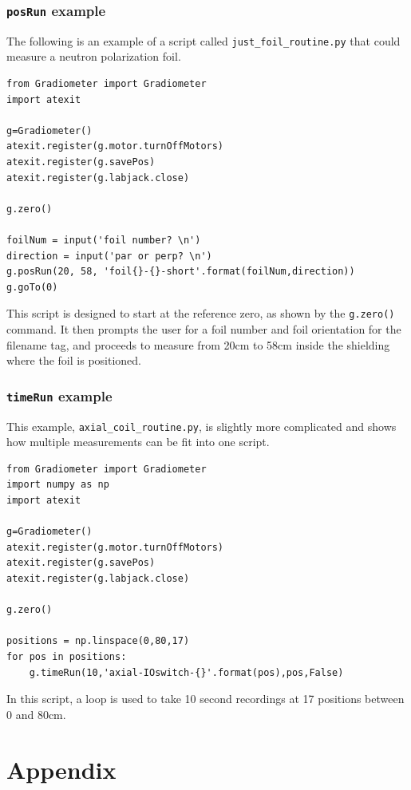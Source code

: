 \documentclass{TheMartianReport}
\newcommand{\pyinline}[1]{\texttt{#1}}
\newcommand{\shellinline}[1]{\texttt{#1}}
\begin{document}
\subsubsection{\pyinline{posRun} example}
The following is an example of a script called \shellinline{just_foil_routine.py} that could measure a neutron polarization foil.
\begin{verbatim}
from Gradiometer import Gradiometer
import atexit

g=Gradiometer()
atexit.register(g.motor.turnOffMotors)
atexit.register(g.savePos)
atexit.register(g.labjack.close)

g.zero()

foilNum = input('foil number? \n')
direction = input('par or perp? \n')
g.posRun(20, 58, 'foil{}-{}-short'.format(foilNum,direction))
g.goTo(0)
\end{verbatim}
This script is designed to start at the reference zero, as shown by the \pyinline{g.zero()} command. It then prompts the user for a foil number and foil orientation for the filename tag, and proceeds to measure from 20cm to 58cm inside the shielding where the foil is positioned.

\subsubsection{\pyinline{timeRun} example}
This example, \shellinline{axial_coil_routine.py}, is slightly more complicated and shows how multiple measurements can be fit into one script.
\begin{verbatim}
from Gradiometer import Gradiometer
import numpy as np
import atexit

g=Gradiometer()
atexit.register(g.motor.turnOffMotors)
atexit.register(g.savePos)
atexit.register(g.labjack.close)

g.zero()

positions = np.linspace(0,80,17)
for pos in positions:
    g.timeRun(10,'axial-IOswitch-{}'.format(pos),pos,False)
\end{verbatim}
In this script, a loop is used to take 10 second recordings at 17 positions between 0 and 80cm. 

\section{Appendix}
\end{document}
